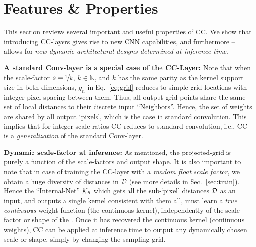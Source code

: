 \section{Features \& Properties}
\label{sec:features}
This section reviews several important and useful properties of CC.
We show that introducing CC-layers gives rise to new CNN capabilities, and furthermore -- allows for \emph{new dynamic architectural designs determined at inference time}.

\textbf{A standard Conv-layer is a special case of the CC-Layer:}
Note that when the scale-factor $s=\nicefrac{1}{k}$, $k \in \mathbb{N}$, and $k$ has the same parity as the kernel support size in both dimensions, $g_n$ in Eq.~\ref{eq:grid} reduces to simple grid locations with integer pixel spacing between them. Thus, all output grid points share the same set of local distances to their discrete input ``Neighbors''. Hence, the set of weights are shared by all output `pixels', which is the case in standard convolution. This implies that  for integer scale ratios CC reduces to standard convolution, i.e.,  CC is a \emph{generalization} of the standard Conv-layer.


\textbf{Dynamic scale-factor at inference:} As mentioned, the projected-grid is purely a function of the scale-factors and output shape. It is also important to note that in case of training the CC-layer with a \emph{random float scale factor}, we obtain a huge diversity of distances in $\textcolor{black}{\mathcal{D}}$ (see more details in Sec.~\ref{sec:train}). Hence the ``Internal-Net'' $\textcolor{black}{\mathcal{K}_\theta}$ which gets all the sub-`pixel' distances $\textcolor{black}{\mathcal{D}}$ as an input, and outputs a single kernel  consistent with them all,  must learn a  \emph{true continuous} weight function (the continuous kernel), independently of the scale factor or shape of the . Once it has recovered the continuous kernel (continuous weights),  CC can be applied at inference time to output any dynamically chosen scale or shape, simply by changing the sampling grid.

